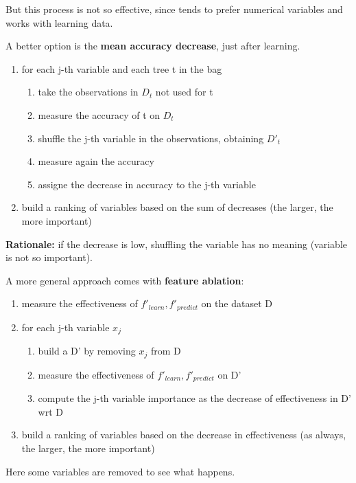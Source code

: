 But this process is not so effective, since tends to prefer numerical variables and works with learning data. 

A better option is the \textbf{mean accuracy decrease}, just after learning.
\begin{enumerate}
    \item for each j-th variable and each tree t in the bag 
    \begin{enumerate}
        \item take the observations in $D_t$ not used for t 
        \item measure the accuracy of t on $D_t$
        \item shuffle the j-th variable in the observations, obtaining $D'_t$
        \item measure again the accuracy 
        \item assigne the decrease in accuracy to the j-th variable 
    \end{enumerate}
    \item build a ranking of variables based on the sum of decreases (the larger, the more important)
\end{enumerate}

\textbf{Rationale:} if the decrease is low, shuffling the variable has no meaning (variable is not so important).

A more general approach comes with \textbf{feature ablation}:
\begin{enumerate}
    \item measure the effectiveness of $f'_{learn}, f'_{predict}$ on the dataset D 
    \item for each j-th variable $x_j$
    \begin{enumerate}
        \item build a D' by removing $x_j$ from D 
        \item measure the effectiveness of $f'_{learn}, f'_{predict}$ on D' 
        \item compute the j-th variable importance as the decrease of effectiveness in D' wrt D 
    \end{enumerate}
    \item build a ranking of variables based on the decrease in effectiveness (as always, the larger, the more important)
\end{enumerate}

Here some variables are removed to see what happens.


